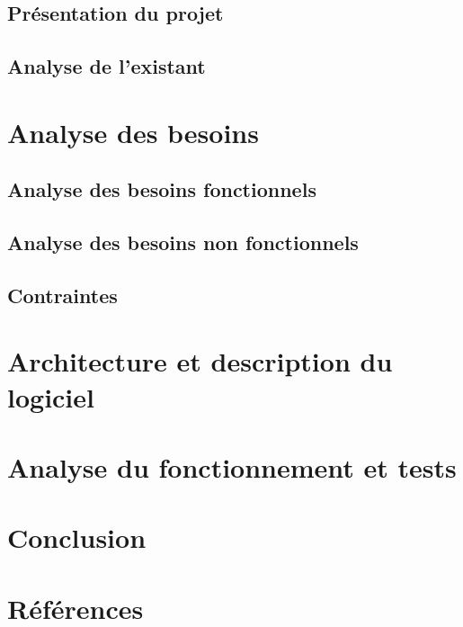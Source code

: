 \documentclass[12pt,a4paper]{article}
\begin{document}
\subsection{Présentation du projet}
\subsection{Analyse de l'existant}

\section{Analyse des besoins}
\subsection{Analyse des besoins fonctionnels}
\subsection{Analyse des besoins non fonctionnels}
\subsection{Contraintes}

\section{Architecture et description du logiciel}

\section{Analyse du fonctionnement et tests}

\section{Conclusion}

\section{Références}


\end{document}
